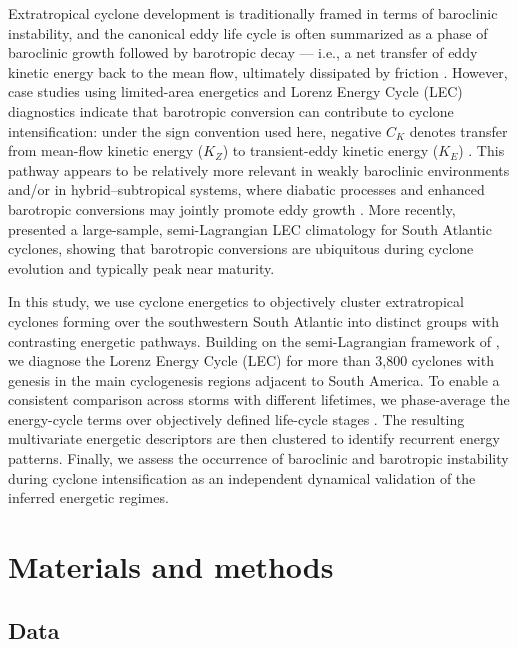 \documentclass[pdflatex,sn-chicago]{sn-jnl}%
\theoremstyle{plain}
\theoremstyle{definition}
\theoremstyle{remark}
\theoremstyle{definition}
\begin{document}
Extratropical cyclone development is traditionally framed in terms of baroclinic instability, and the canonical eddy life cycle is often summarized as a phase of baroclinic growth followed by barotropic decay — i.e., a net transfer of eddy kinetic energy back to the mean flow, ultimately dissipated by friction \citep[e.g.,][]{simmons1978life,randel1985observed,ma2021lorenz,cai2007dynamical}. However, case studies using limited-area energetics and Lorenz Energy Cycle (LEC) diagnostics indicate that barotropic conversion can contribute to cyclone intensification: under the sign convention used here, negative $C_K$ denotes transfer from mean-flow kinetic energy ($K_Z$) to transient-eddy kinetic energy ($K_E$) \citep[e.g.,][]{bulic2006limited,dias2011energy,black2013universal,cavicchia2018energetics}. This pathway appears to be relatively more relevant in weakly baroclinic environments and/or in hybrid–subtropical systems, where diabatic processes and enhanced barotropic conversions may jointly promote eddy growth \citep[e.g.,][]{veiga2008analysis,pezza2014large,cavicchia2019physically}. More recently, \citet{de2025lorenz} presented a large-sample, semi-Lagrangian LEC climatology for South Atlantic cyclones, showing that barotropic conversions are ubiquitous during cyclone evolution and typically peak near maturity.

In this study, we use cyclone energetics to objectively cluster extratropical cyclones forming over the southwestern South Atlantic into distinct groups with contrasting energetic pathways. Building on the semi-Lagrangian framework of \citet{de2025lorenz}, we diagnose the Lorenz Energy Cycle (LEC) for more than 3,800 cyclones with genesis in the main cyclogenesis regions adjacent to South America. To enable a consistent comparison across storms with different lifetimes, we phase-average the energy-cycle terms over objectively defined life-cycle stages \citep{couto2024new}. The resulting multivariate energetic descriptors are then clustered to identify recurrent energy patterns. Finally, we assess the occurrence of baroclinic and barotropic instability during cyclone intensification as an independent dynamical validation of the inferred energetic regimes.

\section{Materials and methods}

\subsection{Data}\label{sec:data}
\end{document}
